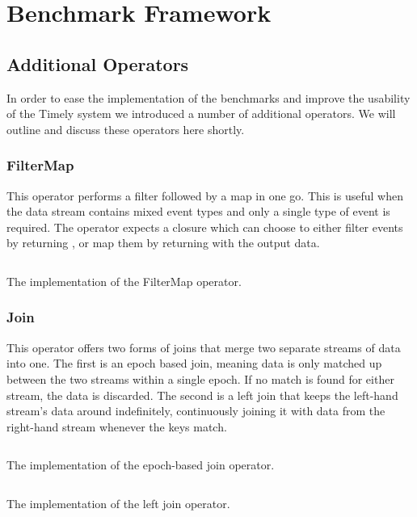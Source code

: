 \section{Benchmark Framework}


\subsection{Additional Operators}
In order to ease the implementation of the benchmarks and improve the usability of the Timely system we introduced a number of additional operators. We will outline and discuss these operators here shortly.

\subsubsection{FilterMap}
This operator performs a filter followed by a map in one go. This is useful when the data stream contains mixed event types and only a single type of event is required. The operator expects a closure which can choose to either filter events by returning , or map them by returning  with the output data.

\begin{listing}[H]
  \inputminted[firstline=10,lastline=22]{rust}{benchmarks/src/operators/filtermap.rs}
  \caption{The implementation of the FilterMap operator.}
  \label{lst:filtermap}
\end{listing}

\subsubsection{Join}
This operator offers two forms of joins that merge two separate streams of data into one. The first is an epoch based join, meaning data is only matched up between the two streams within a single epoch. If no match is found for either stream, the data is discarded. The second is a left join that keeps the left-hand stream's data around indefinitely, continuously joining it with data from the right-hand stream whenever the keys match.

\begin{listing}[H]
  \inputminted[firstline=26,lastline=76]{rust}{benchmarks/src/operators/join.rs}
  \caption{The implementation of the epoch-based join operator.}
  \label{lst:epoch-join}
\end{listing}

\begin{listing}[H]
  \inputminted[firstline=78,lastline=112]{rust}{benchmarks/src/operators/join.rs}
  \caption{The implementation of the left join operator.}
  \label{lst:left-join}
\end{listing}

